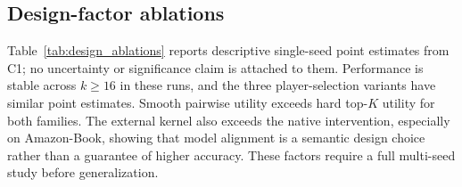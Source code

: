 \documentclass[pdflatex,sn-mathphys-num]{sn-jnl}
\begin{document}
\subsection{Design-factor ablations}\label{subsec:design_ablations}

Table~\ref{tab:design_ablations} reports descriptive single-seed point estimates from C1; no uncertainty or significance claim is attached to them. Performance is stable across $k\ge16$ in these runs, and the three player-selection variants have similar point estimates. Smooth pairwise utility exceeds hard top-$K$ utility for both families. The external kernel also exceeds the native intervention, especially on Amazon-Book, showing that model alignment is a semantic design choice rather than a guarantee of higher accuracy. These factors require a full multi-seed study before generalization.
\end{document}
